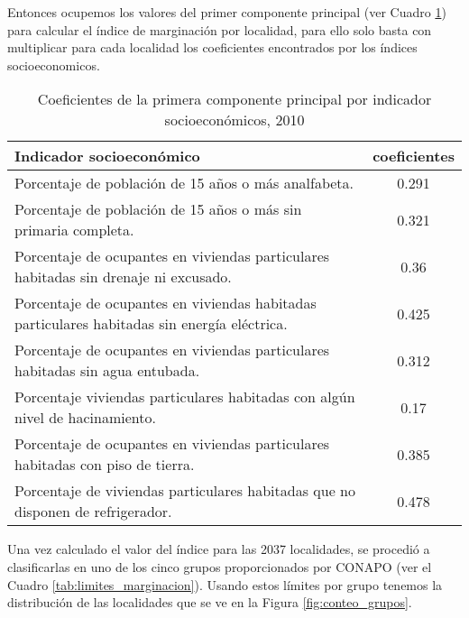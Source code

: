 \documentclass[paper=letter, fontsize=11pt]{scrartcl}
\numberwithin{equation}{section} %
\numberwithin{figure}{section} %
\numberwithin{table}{section} %
\begin{document}
Entonces ocupemos los valores del primer componente principal (ver Cuadro \ref{tab:cp_1}) para calcular el índice de marginación por localidad, para ello solo basta con multiplicar para cada localidad los coeficientes encontrados por los índices socioeconomicos.   
\begin{table}[H]
    \centering
    \begin{tabular}{lc}
        Indicador socioeconómico & coeficientes\\ \hline \hline
        Porcentaje de población de 15 años o más analfabeta. & 0.291 \\
        Porcentaje de población de 15 años o más sin primaria completa. & 0.321\\
        Porcentaje de ocupantes en viviendas particulares habitadas sin drenaje ni excusado. & 0.36\\
        Porcentaje de ocupantes en viviendas habitadas particulares habitadas sin energía eléctrica. & 0.425 \\
        Porcentaje de ocupantes en viviendas particulares habitadas sin agua entubada. & 0.312\\
        Porcentaje viviendas particulares habitadas con algún nivel de hacinamiento. &  0.17  \\
        Porcentaje de ocupantes en viviendas particulares habitadas con piso de tierra. & 0.385\\
        Porcentaje de viviendas particulares habitadas que no disponen de refrigerador. & 0.478\\ \hline \hline 
    \end{tabular}
    \caption{Coeficientes de la primera componente principal por indicador socioeconómicos, 2010}
    \label{tab:cp_1}
\end{table}
Una vez calculado el valor del índice para las 2037 localidades, se procedió a clasificarlas en uno de los cinco grupos proporcionados por CONAPO (ver el Cuadro \ref{tab:limites_marginacion}). Usando estos límites por grupo tenemos la distribución de las localidades que se ve en la Figura \ref{fig:conteo_grupos}. 
\end{document}
